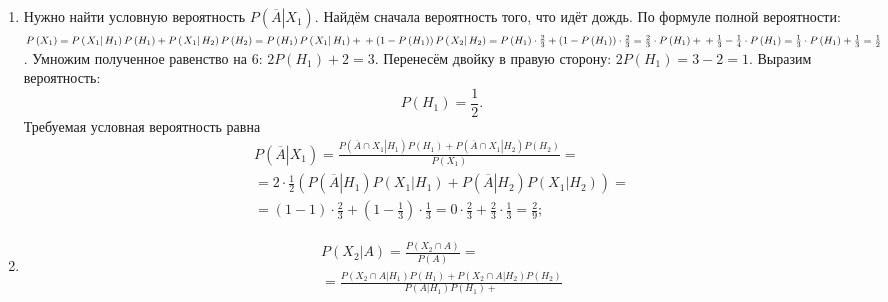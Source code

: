 \begin{enumerate}[label=\alph*)]
\item Нужно найти условную вероятность $P \left( \left. \overline{A} \right| X_1 \right) $.
Найдём сначала вероятность того, что идёт дождь.
По формуле полной вероятности:
$P \left( X_1 \right) =
P \left( \left. X_1 \right| H_1 \right) P \left( H_1 \right) + P \left( \left. X_1 \right| H_2 \right) P \left( H_2 \right) =
P \left( H_1 \right) P \left( \left. X_1 \right| H_1 \right) +  \\
+ \left( 1 - P \left( H_1 \right) \right) P \left( \left. X_2 \right| H_2 \right) =
P \left( H_1 \right) \cdot \frac{2}{3} + \left( 1 - P \left( H_1 \right) \right) \cdot \frac{2}{3} =
\frac{2}{3} \cdot P \left( H_1 \right) + \\
+ \frac{1}{3} - \frac{1}{4} \cdot P \left( H_1 \right) =
\frac{1}{3} \cdot P \left( H_1 \right) + \frac{1}{3} =
\frac{1}{2}$.
Умножим полученное равенство на 6: $2P \left( H_1 \right) + 2 = 3$.
Перенесём двойку в правую сторону: $2P \left( H_1 \right) = 3 - 2 = 1$.
Выразим вероятность:
$$P \left( H_1 \right) =
\frac{1}{2}.$$
Требуемая условная вероятность равна
\begin{equation*}
\begin{split}
P \left( \left. \overline{A} \right| X_1 \right) =
\frac{P \left( \left. \overline{A} \cap X_1 \right| H_1 \right) P \left( H_1 \right) +
P \left( \left. \overline{A} \cap X_1 \right| H_2 \right) P \left( H_2 \right) }{P \left( X_1 \right) } = \\
= 2 \cdot \frac{1}{2} \left( P \left( \left. \overline{A} \right| H_1 \right) P \left( \left. X_1 \right| H_1 \right) +
P \left( \left. \overline{A} \right| H_2 \right) P \left( \left. X_1 \right| H_2 \right) \right) = \\
= \left( 1-1 \right) \cdot \frac{2}{3} + \left( 1 - \frac{1}{3} \right) \cdot \frac{1}{3} =
0 \cdot \frac{2}{3} + \frac{2}{3} \cdot \frac{1}{3} =
\frac{2}{9};
\end{split}
\end{equation*}
\item 
\begin{equation*}
\begin{split}
P \left( \left. X_2 \right| A \right) =
\frac{P \left( X_2 \cap A \right) }{P \left( A \right) } = \\
= \frac{P \left( \left. X_2 \cap A \right| H_1 \right) P \left( H_1 \right) +
P \left( \left. X_2 \cap A \right| H_2 \right) P \left( H_2 \right) }{P \left( \left. A \right| H_1 \right) P \left( H_1 \right) +
}
\end{split}
\end{equation*}
\end{enumerate}
